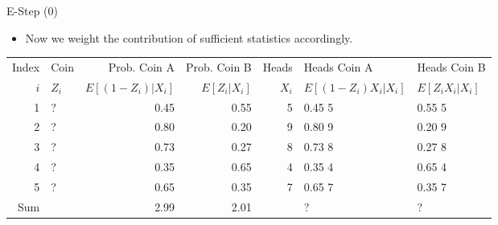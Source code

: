 \documentclass[dvipdfmx,bigger,aspectratio=169]{beamer}
\begin{document}
\begin{frame}[fragile,allowframebreaks,label=,t]{E-Step (0)}
\newpage
\begin{itemize}
\item Now we weight the contribution of sufficient statistics accordingly.
\end{itemize}
\footnotesize
\begin{center}
\begin{tabular}{r|l|rr|r|ll|}
Index & Coin & Prob. Coin A & Prob. Coin B & Heads & Heads Coin A & Heads Coin B\\
\(i\) & \(Z_{i}\) & \(E[(1-Z_{i})\vert X_{i}]\) & \(E[Z_{i}\vert X_{i}]\) & \(X_{i}\) & \(E[(1-Z_{i}) X_{i} \vert X_{i}]\) & \(E[Z_{i} X_{i} \vert X_{i}]\)\\
\hline
1 & ? & 0.45 & 0.55 & 5 & 0.45 \texttimes{} 5 & 0.55 \texttimes{} 5\\
2 & ? & 0.80 & 0.20 & 9 & 0.80 \texttimes{} 9 & 0.20 \texttimes{} 9\\
3 & ? & 0.73 & 0.27 & 8 & 0.73 \texttimes{} 8 & 0.27 \texttimes{} 8\\
4 & ? & 0.35 & 0.65 & 4 & 0.35 \texttimes{} 4 & 0.65 \texttimes{} 4\\
5 & ? & 0.65 & 0.35 & 7 & 0.65 \texttimes{} 7 & 0.35 \texttimes{} 7\\
\hline
Sum &  & 2.99 & 2.01 &  & ? & ?\\
\end{tabular}
\end{center}
\normalsize


\end{frame}
\end{document}
